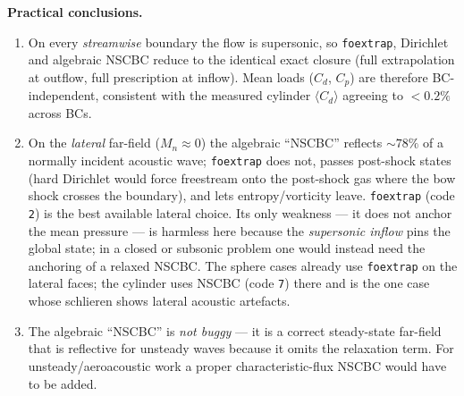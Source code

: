 \documentclass[11pt]{article}
\begin{document}
\noindent
\textbf{Practical conclusions.}
\begin{enumerate}
\item On every \emph{streamwise} boundary the flow is supersonic, so
\texttt{foextrap}, Dirichlet and algebraic NSCBC reduce to the identical
exact closure (full extrapolation at outflow, full prescription at inflow).
Mean loads ($C_d$, $C_p$) are therefore BC-independent, consistent with the
measured cylinder $\langle C_d\rangle$ agreeing to $<0.2\%$ across BCs.
\item On the \emph{lateral} far-field ($M_n\!\approx\!0$) the algebraic
``NSCBC'' reflects $\sim\!78\%$ of a normally incident acoustic wave;
\texttt{foextrap} does not, passes post-shock states (hard Dirichlet would force
freestream onto the post-shock gas where the bow shock crosses the boundary),
and lets entropy/vorticity leave. \texttt{foextrap} (code \texttt{2}) is the best
available lateral choice. Its only weakness --- it does not anchor the mean
pressure --- is harmless here because the \emph{supersonic inflow} pins the
global state; in a closed or subsonic problem one would instead need the
anchoring of a relaxed NSCBC. The sphere cases already use \texttt{foextrap} on
the lateral faces; the cylinder uses NSCBC (code \texttt{7}) there and is the one
case whose schlieren shows lateral acoustic artefacts.
\item The algebraic ``NSCBC'' is \emph{not buggy} --- it is a correct
steady-state far-field that is reflective for unsteady waves because it omits
the relaxation term. For unsteady/aeroacoustic work a proper
characteristic-flux NSCBC would have to be added.
\end{enumerate}
\end{document}
